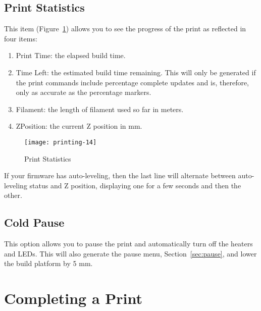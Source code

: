 \subsection{Print Statistics}\label{sec:printstat}

This item (Figure~\ref{fig:printstatistics}) allows you to see the progress of the print as reflected in four items:
\begin{enumerate}
\item Print Time: the elapsed build time.
\item Time Left: the estimated build time remaining.  This will only be generated if the print commands include percentage complete updates and is, therefore, only as accurate as the percentage markers.
\item Filament: the length of filament used so far in meters.
\item ZPosition: the current Z position in mm.
\end{enumerate}

\begin{figure}[!htbp]
  \centering
    \texttt{[image: printing-14]}
    \caption{Print Statistics}
  \label{fig:printstatistics}
\end{figure}

If your firmware has auto-leveling, then the last line will alternate between auto-leveling status and Z position, displaying one for a few seconds and then the other.


\subsection{Cold Pause}\label{sec:cold}

This option allows you to pause the print and automatically turn off the heaters and LEDs.  This will also generate the pause menu, Section~\ref{sec:pause}, and lower the build platform by 5 mm.


\section{Completing a Print} \label{sec:print-done}

